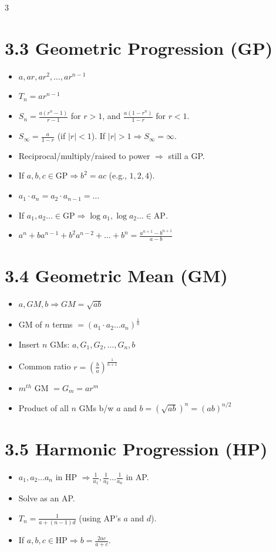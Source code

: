 \documentclass[11pt,a4paper,landscape]{article}
\begin{document}
\begin{multicols*}{3}
\section*{3.3 Geometric Progression (GP)}
\begin{itemize}
\item $a, ar, ar^2, \dots, ar^{n-1}$
\item $T_n = ar^{n-1}$
\item $S_n = \frac{a(r^n-1)}{r-1}$ for $r>1$, and $\frac{a(1-r^n)}{1-r}$ for $r<1$.
\item $S_\infty = \frac{a}{1-r}$ (if $|r|<1$). If $|r|>1 \Rightarrow S_\infty = \infty$.
\item Reciprocal/multiply/raised to power $\Rightarrow$ still a GP.
\item If $a,b,c \in \text{GP} \Rightarrow b^2 = ac$ (e.g., $1, 2, 4$).
\item $a_1 \cdot a_n = a_2 \cdot a_{n-1} = \dots$
\item If $a_1, a_2 \dots \in \text{GP} \Rightarrow \log a_1, \log a_2 \dots \in \text{AP}$.
\item $a^n + b a^{n-1} + b^2 a^{n-2} + \dots + b^n = \frac{a^{n+1}-b^{n+1}}{a-b}$
\end{itemize}

\section*{3.4 Geometric Mean (GM)}
\begin{itemize}
\item $a, GM, b \Rightarrow GM = \sqrt{ab}$
\item GM of $n$ terms $= (a_1 \cdot a_2 \dots a_n)^{\frac{1}{n}}$
\item Insert $n$ GMs: $a, G_1, G_2, \dots, G_n, b$
\item Common ratio $r = \left(\frac{b}{a}\right)^{\frac{1}{n+1}}$
\item $m^{th}$ GM $= G_m = a r^m$
\item Product of all $n$ GMs b/w $a$ and $b = (\sqrt{ab})^n = (ab)^{n/2}$
\end{itemize}

\section*{3.5 Harmonic Progression (HP)}
\begin{itemize}
\item $a_1, a_2 \dots a_n$ in HP $\Rightarrow \frac{1}{a_1}, \frac{1}{a_2} \dots \frac{1}{a_n}$ in AP.
\item Solve as an AP.
\item $T_n = \frac{1}{a + (n-1)d}$ (using AP's $a$ and $d$).
\item If $a,b,c \in \text{HP} \Rightarrow b = \frac{2ac}{a+c}$.
\end{itemize}


\end{multicols*}
\end{document}
